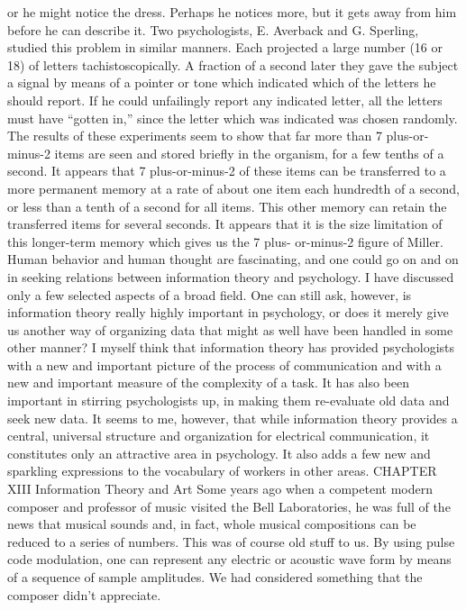 {{{{{{{{{{{{or he might notice the dress. Perhaps he notices more, but it gets
away from him before he can describe it.
Two psychologists, E. Averback and G. Sperling, studied this
problem in similar manners. Each projected a large number (16
or 18) of letters tachistoscopically. A fraction of a second later
they gave the subject a signal by means of a pointer or tone which
indicated which of the letters he should report. If he could unfailingly
report any indicated letter, all the letters must have “gotten
in,” since the letter which was indicated was chosen randomly.
The results of these experiments seem to show that far more than
7 plus-or-minus-2 items are seen and stored briefly in the organism,
for a few tenths of a second. It appears that 7 plus-or-minus-2 of
these items can be transferred to a more permanent memory at a
rate of about one item each hundredth of a second, or less than a
tenth of a second for all items. This other memory can retain the
transferred items for several seconds. It appears that it is the size
limitation of this longer-term memory which gives us the 7 plus-
or-minus-2 figure of Miller.
Human behavior and human thought are fascinating, and one
could go on and on in seeking relations between information theory
and psychology. I have discussed only a few selected aspects of a
broad field. One can still ask, however, is information theory really
highly important in psychology, or does it merely give us another
way of organizing data that might as well have been handled in
some other manner? I myself think that information theory has
provided psychologists with a new and important picture of the
process of communication and with a new and important measure
of the complexity of a task. It has also been important in stirring
psychologists up, in making them re-evaluate old data and seek
new data. It seems to me, however, that while information theory
provides a central, universal structure and organization for electrical
communication, it constitutes only an attractive area in
psychology. It also adds a few new and sparkling expressions to
the vocabulary of workers in other areas.
CHAPTER XIII Information
Theory and Art
Some years ago when a competent modern composer and
professor of music visited the Bell Laboratories, he was full of the
news that musical sounds and, in fact, whole musical compositions
can be reduced to a series of numbers. This was of course old stuff
to us. By using pulse code modulation, one can represent any
electric or acoustic wave form by means of a sequence of sample
amplitudes.
We had considered something that the composer didn’t appreciate.
}}}}}}}}}}}}
